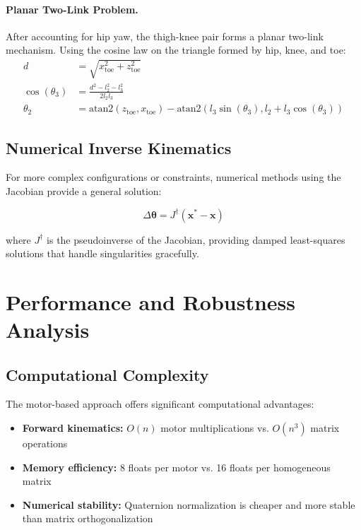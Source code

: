 \documentclass[11pt]{article}
\begin{document}
\paragraph{Planar Two-Link Problem.} After accounting for hip yaw, the thigh-knee pair forms a planar two-link mechanism. Using the cosine law on the triangle formed by hip, knee, and toe:
\begin{align}
d &= \sqrt{x_{\text{toe}}^2 + z_{\text{toe}}^2}\\
\cos(\theta_3) &= \frac{d^2 - l_2^2 - l_3^2}{2 l_2 l_3}\\
\theta_2 &= \text{atan2}(z_{\text{toe}}, x_{\text{toe}}) - \text{atan2}(l_3 \sin(\theta_3), l_2 + l_3 \cos(\theta_3))
\end{align}

\subsection{Numerical Inverse Kinematics}

For more complex configurations or constraints, numerical methods using the Jacobian provide a general solution:

\[\Delta \boldsymbol{\theta} = J^{\dagger} (\mathbf{x}^* - \mathbf{x})\]

where $J^{\dagger}$ is the pseudoinverse of the Jacobian, providing damped least-squares solutions that handle singularities gracefully.

\section{Performance and Robustness Analysis}

\subsection{Computational Complexity}

The motor-based approach offers significant computational advantages:

\begin{itemize}
    \item \textbf{Forward kinematics:} $O(n)$ motor multiplications vs. $O(n^3)$ matrix operations
    \item \textbf{Memory efficiency:} 8 floats per motor vs. 16 floats per homogeneous matrix
    \item \textbf{Numerical stability:} Quaternion normalization is cheaper and more stable than matrix orthogonalization
\end{itemize}
\end{document}
